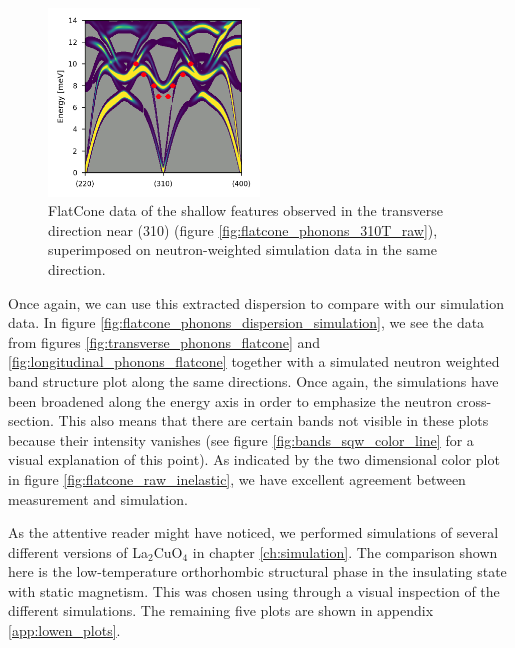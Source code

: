 \begin{figure}
    \centering
    \includegraphics[width=0.5\textwidth]{fig/lowen/flatcone_fits_simulation_310T.png}
    \caption{FlatCone data of the shallow features observed in the transverse direction near (310) (figure \ref{fig:flatcone_phonons_310T_raw}), superimposed on neutron-weighted simulation data in the same direction.}
    \label{fig:flatcone_phonons_310T_sim}
\end{figure}

Once again, we can use this extracted dispersion to compare with our simulation data. In figure \ref{fig:flatcone_phonons_dispersion_simulation}, we see the data from figures \ref{fig:transverse_phonons_flatcone} and \ref{fig:longitudinal_phonons_flatcone}  together with a simulated neutron weighted band structure plot along the same directions. Once again, the simulations have been broadened along the energy axis in order to emphasize the neutron cross-section. This also means that there are certain bands not visible in these plots because their intensity vanishes (see figure \ref{fig:bands_sqw_color_line} for a visual explanation of this point). As indicated by the two dimensional color plot in figure \ref{fig:flatcone_raw_inelastic}, we have excellent agreement between measurement and simulation.

As the attentive reader might have noticed, we performed simulations of several different versions of La$_2$CuO$_4$ in chapter \ref{ch:simulation}. The comparison shown here is the low-temperature orthorhombic structural phase in the insulating state with static magnetism. This was chosen using through a visual inspection of the different simulations. The remaining five plots are shown in appendix \ref{app:lowen_plots}.

